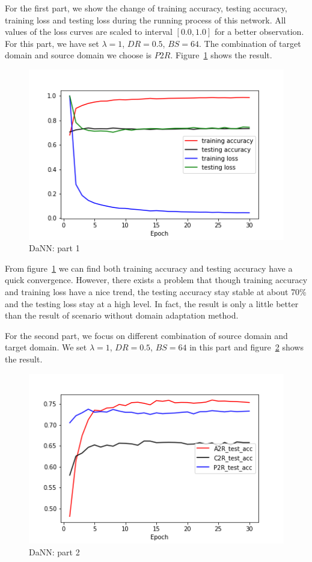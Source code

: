 \documentclass[conference]{IEEEtran}
\begin{document}
For the first part, we show the change of training accuracy, testing accuracy, training loss and testing loss during the running process of this network. All values of the loss curves are scaled to interval $[0.0, 1.0]$ for a better observation. For this part, we have set $\lambda = 1$, $DR = 0.5$, $BS = 64$. The combination of target domain and source domain we choose is $P2R$. Figure~\ref{fig:DaNN1} shows the result.
\begin{figure}[!h]
    \centerline{\includegraphics[scale=0.4]{HDaNN/DaNN_fig1.png}}
    \caption{DaNN: part 1}
    \label{fig:DaNN1}
\end{figure}

From figure~\ref{fig:DaNN1} we can find both training accuracy and testing accuracy have a quick convergence. However, there exists a problem that though training accuracy and training loss have a nice trend, the testing accuracy stay stable at about 70\% and the testing loss stay at a high level. In fact, the result is only a little better than the result of scenario without domain adaptation method.

For the second part, we focus on different combination of source domain and target domain. We set $\lambda = 1$, $DR = 0.5$, $BS = 64$ in this part and figure~\ref{fig:DaNN2} shows the result.
\begin{figure}[!h]
    \centerline{\includegraphics[scale=0.4]{HDaNN/DaNN_fig2.png}}
    \caption{DaNN: part 2}
    \label{fig:DaNN2}
\end{figure}
\end{document}
